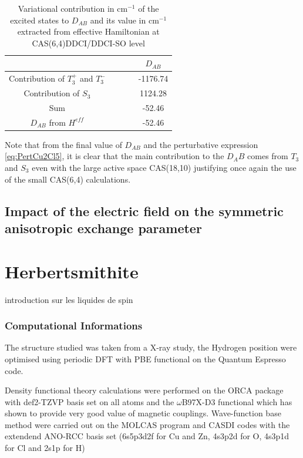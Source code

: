 \documentclass[10pt]{report}
\numberwithin{equation}{section}
\begin{document}
\begin{table}
    \centering
    \begin{tabular}{c c c}
        \hline
        \hline
         & $\qquad$&$D_{AB}$\\
         \hline
         Contribution of $T_3^+$ and $T_3^-$& $\qquad$& -1176.74 \\
         Contribution of $S_3$& $\qquad$& 1124.28\\
         Sum &$\qquad$ &-52.46\\
         $D_{AB}$ from $H^{eff}$ & $\qquad$ &-52.46\\
         \hline
         \hline
    \end{tabular}
    \caption{Variational contribution in cm$^{-1}$ of the excited states to $D_{AB}$ and its value in cm$^{-1}$ extracted from effective Hamiltonian at CAS(6,4)DDCI/DDCI-SO level}
    \label{ContE0}
\end{table}

Note that from the final value of $D_{AB}$ and the perturbative expression \ref{eq:PertCu2Cl5}, it is clear that the main contribution to the $D_AB$ comes from $T_3$ and $S_3$ even with the large active space CAS(18,10) justifying once again the use of the small CAS(6,4) calculations.


\section{Impact of the electric field on the symmetric anisotropic exchange parameter}



\chapter{Herbertsmithite}

introduction sur les liquides de spin

\subsection*{Computational Informations}

The structure studied was taken from a X-ray study, the Hydrogen position were optimised using periodic DFT with PBE functional on the Quantum Espresso code.

Density functional theory calculations were performed on the ORCA package with def2-TZVP basis set on all atoms and the $\omega$B97X-D3 functional which has shown to provide very good value of magnetic couplings.
Wave-function base method were carried out on the MOLCAS program and CASDI codes with the extendend ANO-RCC basis set (6s5p3d2f for Cu and Zn, 4s3p2d
for O, 4s3p1d for Cl and 2s1p for H)
\end{document}
